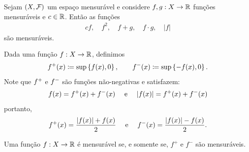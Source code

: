 \begin{prop*}{}
  Sejam $(X, \mathcal F)$ um espaço mensurável e considere $f, g: X \rightarrow \mathbb R$
  funções mensuráveis e $c \in \mathbb R$. Então as funções 
  \begin{align*}
    cf, \quad f^2, \quad f+g, \quad f\cdot g, \quad |f|
  \end{align*}
  são mensuráveis.
\end{prop*}

\noindent
Dada uma função $f: X \rightarrow \mathbb R$, definimos
\begin{align*}
  f^+(x) \coloneq \sup\left\{f(x), 0\right\}, \quad\quad f^-(x)\coloneq \sup\left\{-f(x),0\right\}.
\end{align*}
Note que $f^+$ e $f^-$ são funções não-negativas e satisfazem:
\begin{align*}
  f(x) = f^+(x) + f^-(x) \quad \text{ e }\quad |f(x)| = f^+(x) + f^-(x)
\end{align*}
portanto, 
\begin{align*}
  f^+(x) = \frac{|f(x)| +f(x)}{2} \quad \text{ e }\quad 
  f^-(x) = \frac{|f(x)| - f(x)}{2}.
\end{align*}
\begin{corollary*}{}
  Uma função $f: X \rightarrow \mathbb R$ é mensurável se, e somente se, $f^+$ e $f^-$ são mensuráveis.
\end{corollary*}
